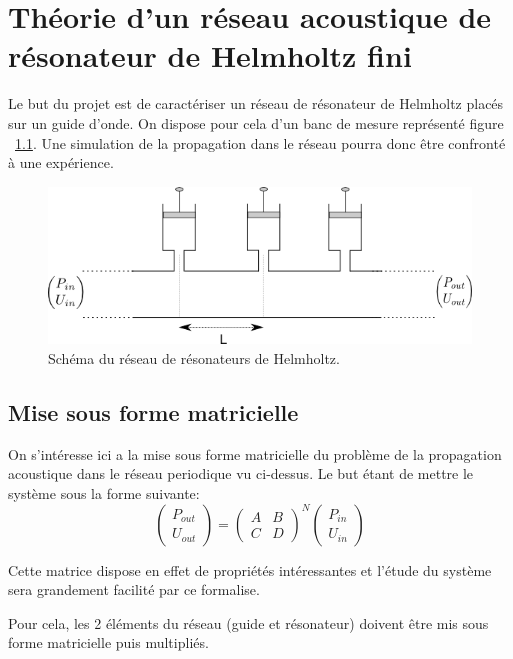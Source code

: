 \chapter{Théorie d'un réseau acoustique de résonateur de Helmholtz fini}
Le but du projet est de caractériser un réseau de résonateur de Helmholtz placés sur un guide d'onde. On dispose pour cela d'un banc de mesure représenté figure ~\ref{schema_infini}. Une simulation de la propagation dans le réseau pourra donc être confronté à une expérience.

\begin{figure}[!ht] \centering
\includegraphics[scale=0.5]{./images_chp1/schema_reseau_infini.png}
\caption{\label{schema_infini} Schéma du réseau de résonateurs de Helmholtz.}
\end{figure}


\section{Mise sous forme matricielle}
On s’intéresse ici a la mise sous forme matricielle du problème de la propagation acoustique dans le réseau periodique vu ci-dessus. Le but étant de mettre le système sous la forme suivante:
\begin{equation}
\begin{pmatrix} P_{out} \\ U_{out} \end{pmatrix} =\begin{pmatrix} A & B \\ C & D \end{pmatrix}^N \begin{pmatrix} P_{in} \\ U_{in} \end{pmatrix} 
\end{equation}

Cette matrice dispose en effet de propriétés intéressantes et l'étude du système sera grandement facilité par ce formalise.

Pour cela, les 2 éléments du réseau (guide et résonateur) doivent être mis sous forme matricielle puis multipliés.

